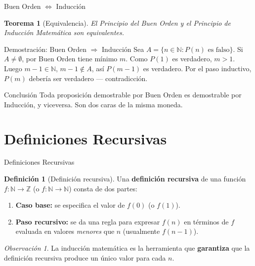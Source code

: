 \documentclass[10pt,aspectratio=169]{beamer}
\theoremstyle{definition}
\newtheorem{definicion}{Definición}
\theoremstyle{plain}
\newtheorem{teorema}{Teorema}
\theoremstyle{remark}
\newtheorem*{observacion}{Observación}
\newcommand{\N}{\mathbb{N}}
\newcommand{\Z}{\mathbb{Z}}
\begin{document}
\begin{frame}{Buen Orden $\Longleftrightarrow$ Inducción}
  \begin{teorema}[Equivalencia]
    El Principio del Buen Orden y el Principio de Inducción Matemática son
    equivalentes.
  \end{teorema}
  \vspace{0.3em}
  \begin{block}{Demostración: Buen Orden $\Rightarrow$ Inducción}
    Sea $A=\{n\in\N : P(n)\text{ es falso}\}$. Si $A\ne\emptyset$, por
    Buen Orden tiene mínimo $m$. Como $P(1)$ es verdadero, $m>1$. Luego
    $m-1\in\N$, $m-1\notin A$, así $P(m-1)$ es verdadero. Por el paso
    inductivo, $P(m)$ debería ser verdadero — contradicción.
  \end{block}
  \begin{alertblock}{Conclusión}
    Toda proposición demostrable por Buen Orden es demostrable por
    Inducción, y viceversa. Son dos caras de la misma moneda.
  \end{alertblock}
\end{frame}

\section{Definiciones Recursivas}
\begin{frame}{Definiciones Recursivas}
  \begin{definicion}[Definición recursiva]
    Una \textbf{definición recursiva} de una función $f:\N\to\Z$ (o
    $f:\N\to\N$) consta de dos partes:
    \begin{enumerate}
      \item \textbf{Caso base:} se especifica el valor de $f(0)$ (o
            $f(1)$).
      \item \textbf{Paso recursivo:} se da una regla para expresar
            $f(n)$ en términos de $f$ evaluada en valores \emph{menores}
            que $n$ (usualmente $f(n-1)$).
    \end{enumerate}
  \end{definicion}
  \vspace{0.3em}
  \begin{observacion}
    La inducción matemática es la herramienta que \textbf{garantiza} que
    la definición recursiva produce un único valor para cada $n$.
  \end{observacion}
\end{frame}
\end{document}
